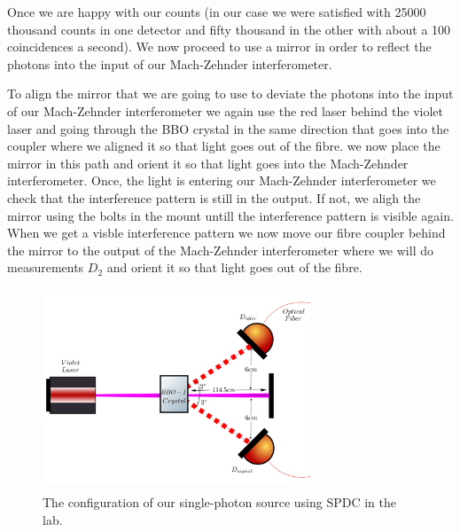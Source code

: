 \documentclass[12pt]{book}
\begin{document}
Once we are happy with our counts (in our case we were satisfied with 25000 thousand counts in one detector and fifty thousand in the other with about a 100 coincidences a second). We now proceed to use a mirror in order to reflect the photons into the input of our Mach-Zehnder interferometer.

To align the mirror that we are going to use to deviate the photons into the input of our Mach-Zehnder interferometer we again use the red laser behind the violet laser and going through the BBO crystal in the same direction that goes into the coupler where we aligned it so that light goes out of the fibre. we now place the mirror in this path and orient it so that light goes into the Mach-Zehnder interferometer. Once, the light is entering our Mach-Zehnder interferometer we check that the interference pattern is still in the output. If not, we aligh the mirror using the bolts in the mount untill the interference pattern is visible again. When we get a visble interference pattern we now move our fibre coupler behind the mirror to the output of the Mach-Zehnder interferometer where we will do measurements $D_{2}$ and orient it so that light goes out of the fibre. 


\begin{figure}[t!]
\center
\includegraphics[width=8cm,height=6cm]{images/sPDC.png}
\caption{The configuration of our single-photon source using SPDC in the lab.}
\end{figure} 
\end{document}
